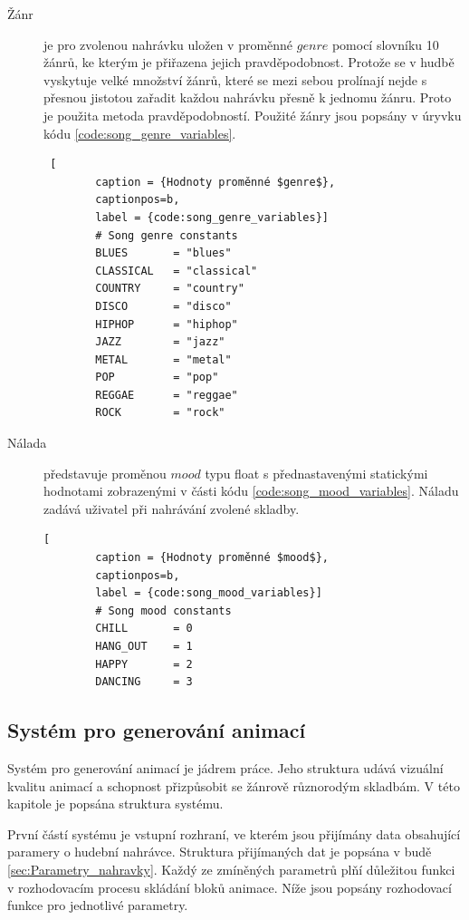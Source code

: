 \begin{description}
    \item[Žánr] je pro zvolenou nahrávku uložen v proměnné $genre$ pomocí slovníku 10 žánrů, ke kterým je přiřazena jejich pravděpodobnost. Protože se v hudbě vyskytuje velké množství žánrů, které se mezi sebou prolínají nejde s přesnou jistotou zařadit každou nahrávku přesně k jednomu žánru. Proto je použita metoda pravděpodobností. Použité žánry jsou popsány v úryvku kódu \ref{code:song_genre_variables}.
    
    \begin{lstlisting} [
        caption = {Hodnoty proměnné $genre$},
        captionpos=b,
        label = {code:song_genre_variables}]
        # Song genre constants
        BLUES       = "blues"
        CLASSICAL   = "classical"
        COUNTRY     = "country"
        DISCO       = "disco"
        HIPHOP      = "hiphop"
        JAZZ        = "jazz"
        METAL       = "metal"
        POP         = "pop"
        REGGAE      = "reggae"
        ROCK        = "rock"
    \end{lstlisting}

    \item[Nálada] představuje proměnou $mood$ typu float s přednastavenými statickými hodnotami zobrazenými v části kódu \ref{code:song_mood_variables}. Náladu zadává uživatel při nahrávání zvolené skladby.  
    
    \begin{lstlisting}[
        caption = {Hodnoty proměnné $mood$},
        captionpos=b,
        label = {code:song_mood_variables}]
        # Song mood constants
        CHILL       = 0
        HANG_OUT    = 1
        HAPPY       = 2
        DANCING     = 3
    \end{lstlisting}
    
\end{description}

\subsection{Systém pro generování animací} \label{sec:System_generovani_animaci}

Systém pro generování animací je jádrem práce. Jeho struktura udává vizuální kvalitu animací a schopnost přizpůsobit se žánrově různorodým skladbám. V této kapitole je popsána struktura systému. 

První částí systému je vstupní rozhraní, ve kterém jsou přijímány data obsahující paramery o hudební nahrávce. Struktura přijímaných dat je popsána v budě \ref{sec:Parametry_nahravky}. Každý ze zmíněných parametrů plňí důležitou funkci v rozhodovacím procesu skládání bloků animace. Níže jsou popsány rozhodovací funkce pro jednotlivé parametry.

